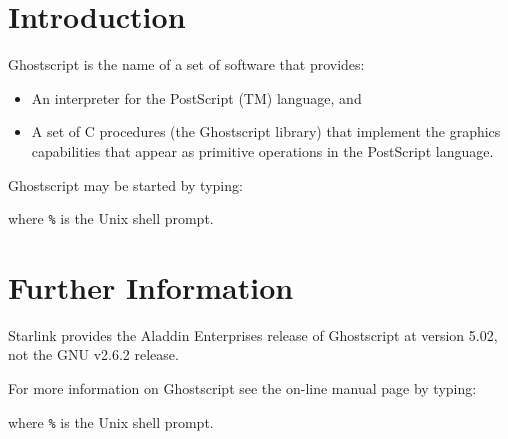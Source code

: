 \documentclass[twoside,11pt,nolof,noabs]{starlink}
\begin{document}
\scfrontmatter


\section{Introduction}

Ghostscript is the name of a set of software that provides:

\begin{itemize}
\item An interpreter for the PostScript (TM) language, and
\item A set of C procedures (the Ghostscript library) that implement
the graphics capabilities that appear as primitive operations in the
PostScript language.

\end{itemize}

Ghostscript may be started by typing:

\begin{terminalv}
\end{terminalv}

where \texttt{\%} is the Unix shell prompt.

\section{Further Information}

Starlink provides the Aladdin Enterprises release of Ghostscript at
version 5.02, not the GNU v2.6.2 release.

For more information on Ghostscript see the on-line manual page by typing:

\begin{terminalv}
\end{terminalv}

where \texttt{\%} is the Unix shell prompt.
\end{document}
